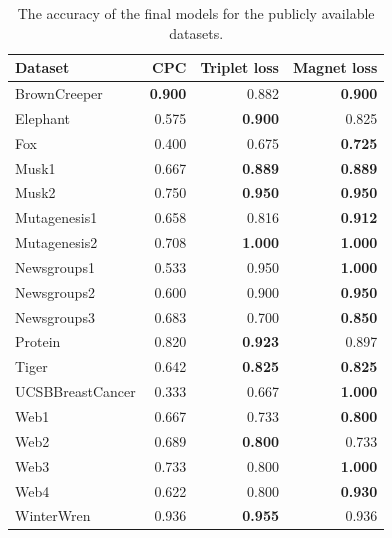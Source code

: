 \begin{table}[h!]
  \centering
  \begin{tabular}{lrrr}
    \toprule
    Dataset          & CPC            & Triplet loss   & Magnet loss \\
    \midrule
    BrownCreeper     & \textbf{0.900} & 0.882          & \textbf{0.900} \\
    Elephant         & 0.575          & \textbf{0.900} & 0.825 \\
    Fox              & 0.400          & 0.675          & \textbf{0.725} \\
    Musk1            & 0.667          & \textbf{0.889} & \textbf{0.889} \\
    Musk2            & 0.750          & \textbf{0.950} & \textbf{0.950} \\
    Mutagenesis1     & 0.658          & 0.816          & \textbf{0.912} \\
    Mutagenesis2     & 0.708          & \textbf{1.000} & \textbf{1.000} \\
    Newsgroups1      & 0.533          & 0.950          & \textbf{1.000} \\
    Newsgroups2      & 0.600          & 0.900          & \textbf{0.950} \\
    Newsgroups3      & 0.683          & 0.700          & \textbf{0.850} \\
    Protein          & 0.820          & \textbf{0.923} & 0.897 \\
    Tiger            & 0.642          & \textbf{0.825} & \textbf{0.825} \\
    UCSBBreastCancer & 0.333          & 0.667          & \textbf{1.000} \\
    Web1             & 0.667          & 0.733          & \textbf{0.800} \\
    Web2             & 0.689          & \textbf{0.800} & 0.733 \\
    Web3             & 0.733          & 0.800          & \textbf{1.000} \\
    Web4             & 0.622          & 0.800          & \textbf{0.930} \\
    WinterWren       & 0.936          & \textbf{0.955} & 0.936 \\
    \bottomrule
  \end{tabular}
  \caption{The accuracy of the final models for the publicly available datasets.}\label{tab:public-accuracy}
\end{table}


